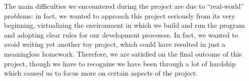 The main difficulties we encountered during the project are due to
``real-world'' problems: in fact, we wanted to approach this project seriously
from its very beginning, virtualizing the environment in which we build and
run the program and adopting clear rules for our development processes.
In fact, we wanted to avoid writing yet another toy project, which could have
resulted in just a meaningless homework.
Therefore, we are satisfied on the final outcome of this project, though we
have to recognize we have been through a lot of hardship which caused us to
focus more on certain aspects of the project.









